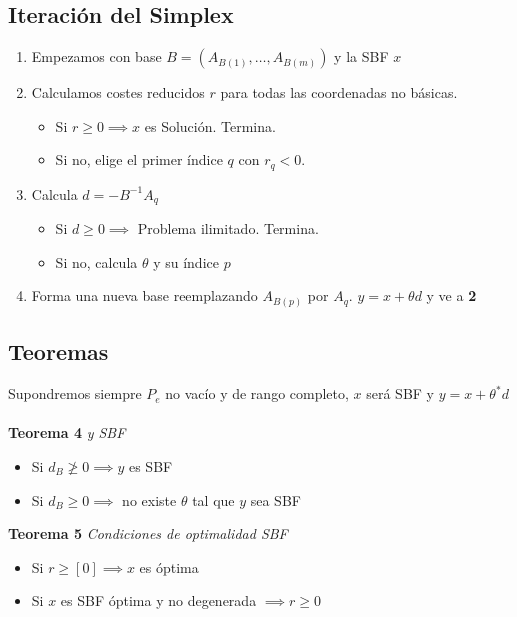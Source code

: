 \documentclass[leqno]{article}
\begin{document}
\subsection{Iteración del Simplex}
\begin{enumerate}
    \item Empezamos con base $B = (A_{B(1)}, \ldots, A_{B(m)})$ y la SBF $x$
    \item Calculamos costes reducidos $r$ para todas las coordenadas no básicas.
    \begin{itemize}
        \item Si $r\geq 0 \implies x$ es Solución. Termina. 
        \item Si no, elige el primer índice $q$ con $r_q<0$. 
    \end{itemize}
    \item Calcula $d = -B^{-1}A_q$
    \begin{itemize}
        \item Si $d\geq 0 \implies $ Problema ilimitado. Termina.
        \item Si no, calcula $\theta$ y su índice $p$
    \end{itemize}
    \item Forma una nueva base reemplazando $A_{B(p)}$ por $A_q$. $y = x + \theta d$ y ve a \textbf{2}
\end{enumerate}

\subsection{Teoremas}
Supondremos siempre $P_e$ no vacío y de rango completo, $x$ será SBF y $y=x+\theta^*d$ \\
\\
\textbf{Teorema 4} \textit{y SBF}
\begin{itemize}
    \item Si $d_B\ngeq0 \implies y$ es SBF
    \item Si $d_B\geq 0 \implies $ no existe $\theta$ tal que $y$ sea SBF
\end{itemize}
\textbf{Teorema 5} \textit{Condiciones de optimalidad SBF}
\begin{itemize}
    \item Si $r\geq [0] \implies x$ es óptima
    \item Si $x$ es SBF óptima y no degenerada $\implies r\geq 0$ 
\end{itemize}
\end{document}

